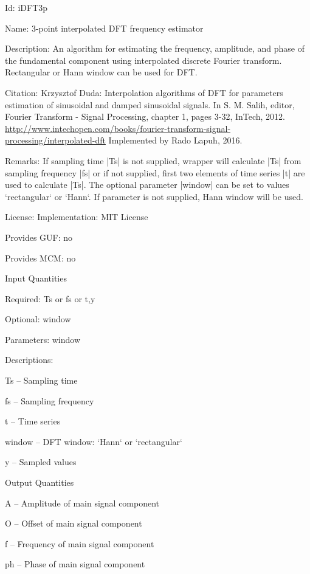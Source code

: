 \begin{tightdesc}
\item [Id:] iDFT3p
\item [Name:] 3-point interpolated DFT frequency estimator
\item [Description:] An algorithm for estimating the frequency, amplitude, and phase of the fundamental component using interpolated discrete Fourier transform. Rectangular or Hann window can be used for DFT.
\item [Citation:] Krzysztof Duda: Interpolation algorithms of DFT for parameters estimation of sinusoidal and damped sinusoidal signals. In S. M. Salih, editor, Fourier Transform - Signal Processing, chapter 1, pages 3-32, InTech, 2012. \url{http://www.intechopen.com/books/fourier-transform-signal-processing/interpolated-dft} Implemented by Rado Lapuh, 2016.
\item [Remarks:] If sampling time |Ts| is not supplied, wrapper will calculate |Ts| from sampling frequency |fs| or if not supplied, first two elements of time series |t| are used to calculate |Ts|. The optional parameter |window| can be set to values `rectangular` or `Hann`. If parameter is not supplied, Hann window will be used.
\item [License:] Implementation: MIT License
\item [Provides GUF:] no
\item [Provides MCM:] no
\item [Input Quantities] \rule{0em}{0em}
    \begin{tightdesc}
    \item [Required:] 
        \textsf{Ts} or \textsf{fs} or \textsf{t},\enspace \textsf{y}
    \item [Optional:] 
        \textsf{window}
    \item [Parameters:] 
        \textsf{window}
    \end{tightdesc}
\item [Descriptions:] \rule{0em}{0em}
    \begin{tightdesc}
        \item[\textsf{Ts}] -- Sampling time
        \item[\textsf{fs}] -- Sampling frequency
        \item[\textsf{t}] -- Time series
        \item[\textsf{window}] -- DFT window: `Hann` or `rectangular`
        \item[\textsf{y}] -- Sampled values
    \end{tightdesc}
\item [Output Quantities] \rule{0em}{0em}
    \begin{tightdesc}
        \item[\textsf{A}] -- Amplitude of main signal component
        \item[\textsf{O}] -- Offset of main signal component
        \item[\textsf{f}] -- Frequency of main signal component
        \item[\textsf{ph}] -- Phase of main signal component
    \end{tightdesc}
\end{tightdesc}
